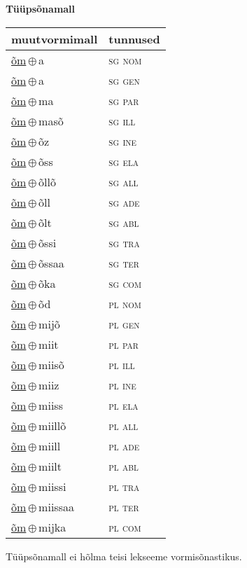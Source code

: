 

\vspace{3.5em}
\noindent \begin{minipage}{\textwidth}
\noindent \textbf{Tüüpsõnamall \,}\\

\begin{sideways}
\begin{tabular}{l l}
muutvormimall & tunnused \\
\hline
\underline{õm}\,$\oplus$\,a & \textsc{ sg nom } \\
\underline{õm}\,$\oplus$\,a & \textsc{ sg gen } \\
\underline{õm}\,$\oplus$\,ma & \textsc{ sg par } \\
\underline{õm}\,$\oplus$\,masõ & \textsc{ sg ill } \\
\underline{õm}\,$\oplus$\,õz & \textsc{ sg ine } \\
\underline{õm}\,$\oplus$\,õss & \textsc{ sg ela } \\
\underline{õm}\,$\oplus$\,õllõ & \textsc{ sg all } \\
\underline{õm}\,$\oplus$\,õll & \textsc{ sg ade } \\
\underline{õm}\,$\oplus$\,õlt & \textsc{ sg abl } \\
\underline{õm}\,$\oplus$\,õssi & \textsc{ sg tra } \\
\underline{õm}\,$\oplus$\,õssaa & \textsc{ sg ter } \\
\underline{õm}\,$\oplus$\,õka & \textsc{ sg com } \\
\underline{õm}\,$\oplus$\,õd & \textsc{ pl nom } \\
\underline{õm}\,$\oplus$\,mijõ & \textsc{ pl gen } \\
\underline{õm}\,$\oplus$\,miit & \textsc{ pl par } \\
\underline{õm}\,$\oplus$\,miisõ & \textsc{ pl ill } \\
\underline{õm}\,$\oplus$\,miiz & \textsc{ pl ine } \\
\underline{õm}\,$\oplus$\,miiss & \textsc{ pl ela } \\
\underline{õm}\,$\oplus$\,miillõ & \textsc{ pl all } \\
\underline{õm}\,$\oplus$\,miill & \textsc{ pl ade } \\
\underline{õm}\,$\oplus$\,miilt & \textsc{ pl abl } \\
\underline{õm}\,$\oplus$\,miissi & \textsc{ pl tra } \\
\underline{õm}\,$\oplus$\,miissaa & \textsc{ pl ter } \\
\underline{õm}\,$\oplus$\,mijka & \textsc{ pl com } \\
\end{tabular}
\end{sideways}
\label{tab:tüüpsõnamall-õma}

\end{minipage}

 
\vspace{1em}
\noindent Tüüpsõnamall  ei hõlma teisi lekseeme vormi\-sõnastikus.
